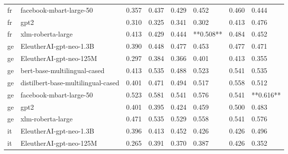 \begin{tabular}{llllllll}
      fr &            facebook-mbart-large-50 & 0.357 &                     0.437 &                 0.429 &                  0.452 &                                   0.460 &     0.444 \\
      fr &                               gpt2 & 0.310 &                     0.325 &                 0.341 &                  0.302 &                                   0.413 &     0.476 \\
      fr &                  xlm-roberta-large & 0.413 &                     0.429 &                 0.444 &              **0.508** &                                   0.484 &     0.452 \\
      ge &            EleutherAI-gpt-neo-1.3B & 0.390 &                     0.448 &                 0.477 &                  0.453 &                                   0.477 &     0.471 \\
      ge &            EleutherAI-gpt-neo-125M & 0.297 &                     0.384 &                 0.366 &                  0.401 &                                   0.413 &     0.355 \\
      ge &       bert-base-multilingual-cased & 0.413 &                     0.535 &                 0.488 &                  0.523 &                                   0.541 &     0.535 \\
      ge & distilbert-base-multilingual-cased & 0.401 &                     0.471 &                 0.494 &                  0.517 &                                   0.558 &     0.512 \\
      ge &            facebook-mbart-large-50 & 0.523 &                     0.581 &                 0.541 &                  0.576 &                                   0.541 & **0.616** \\
      ge &                               gpt2 & 0.401 &                     0.395 &                 0.424 &                  0.459 &                                   0.500 &     0.483 \\
      ge &                  xlm-roberta-large & 0.471 &                     0.535 &                 0.529 &                  0.558 &                                   0.541 &     0.576 \\
      it &            EleutherAI-gpt-neo-1.3B & 0.396 &                     0.413 &                 0.452 &                  0.426 &                                   0.426 &     0.496 \\
      it &            EleutherAI-gpt-neo-125M & 0.265 &                     0.391 &                 0.370 &                  0.387 &                                   0.426 &     0.352 \\

\end{tabular}
